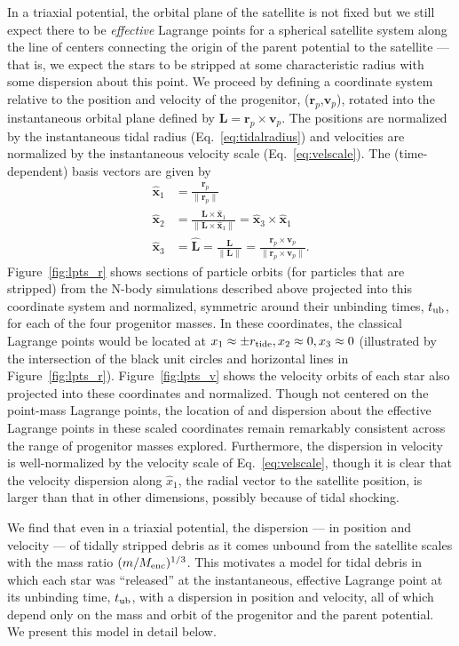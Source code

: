 \documentclass[letterpaper,12pt,preprint]{aastex}
\newcommand{\rtide}{r_{\rm tide}}
\newcommand{\bs}{\boldsymbol}
\newcommand{\tub}{t_{\rm ub}}
\begin{document}
In a triaxial potential, the orbital plane of the satellite is not fixed but we still expect there to be \emph{effective} Lagrange points for a spherical satellite system along the line of centers connecting the origin of the parent potential to the satellite --- that is, we expect the stars to be stripped at some characteristic radius with some dispersion about this point. We proceed by defining a coordinate system relative to the position and velocity of the progenitor, ($\bs{r}_p$,$\bs{v}_p$), rotated into the instantaneous orbital plane defined by $\bs{L} = \bs{r}_p \times \bs{v}_p$. The positions are normalized by the instantaneous tidal radius (Eq.~\ref{eq:tidalradius}) and velocities are normalized by the instantaneous velocity scale (Eq.~\ref{eq:velscale}). 
The (time-dependent) basis vectors are given by
\begin{align}
	\hat{\bs{x}}_1 &= \frac{\bs{r}_p}{\|\bs{r}_p\|}\label{eq:x1}\\
	\hat{\bs{x}}_2 &= \frac{\bs{L} \times \hat{\bs{x}}_1}{\|\bs{L} \times \hat{\bs{x}}_1\|} = \hat{\bs{x}}_3 \times \hat{\bs{x}}_1\\
	\hat{\bs{x}}_3 &= \hat{\bs{L}} = \frac{\bs{L}}{\|\bs{L}\|} = \frac{\bs{r}_p \times \bs{v}_p}{\|\bs{r}_p \times \bs{v}_p\|}\label{eq:x3}.
\end{align}
Figure~\ref{fig:lpts_r} shows sections of particle orbits (for particles that are stripped) from the N-body simulations described above projected into this coordinate system and normalized, symmetric around their unbinding times, $\tub$, for each of the four progenitor masses. In these coordinates, the classical Lagrange points would be located at $x_1\approx\pm\rtide,x_2\approx0,x_3\approx0$ (illustrated by the intersection of the black unit circles and horizontal lines in Figure~\ref{fig:lpts_r}). Figure~\ref{fig:lpts_v} shows the velocity orbits of each star also projected into these coordinates and normalized. Though not centered on the point-mass Lagrange points, the location of and dispersion about the effective Lagrange points in these scaled coordinates remain remarkably consistent across the range of progenitor masses explored. Furthermore, the dispersion in velocity is well-normalized by the velocity scale of Eq.~\ref{eq:velscale}, though it is clear that the velocity dispersion along $\hat{x}_1$, the radial vector to the satellite position, is larger than that in other dimensions, possibly because of tidal shocking. 

We find that even in a triaxial potential, the dispersion --- in position and velocity --- of tidally stripped debris as it comes unbound from the satellite scales with the mass ratio $(m / M_{\rm enc})^{1/3}$. This motivates a model for tidal debris in which each star was ``released'' at the instantaneous, effective Lagrange point at its unbinding time, $\tub$, with a dispersion in position and velocity, all of which depend only on the mass and orbit of the progenitor and the parent potential. We present this model in detail below.
\end{document}
